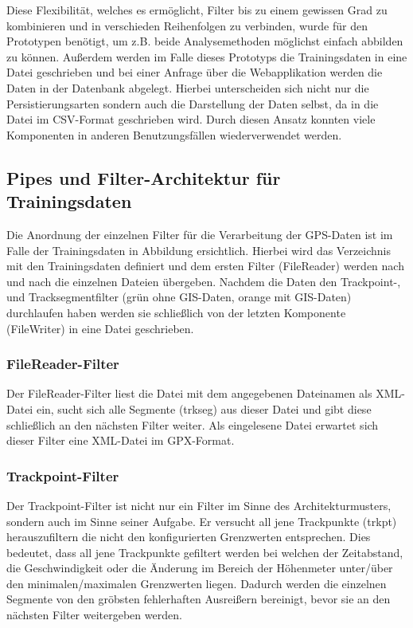 Diese Flexibilität, welches es ermöglicht, Filter bis zu einem gewissen Grad zu kombinieren und in verschieden Reihenfolgen zu verbinden, wurde für den Prototypen benötigt, um z.B. beide Analysemethoden möglichst einfach abbilden zu können. Außerdem werden im Falle dieses Prototyps die Trainingsdaten in eine Datei geschrieben und bei einer Anfrage über die Webapplikation werden die Daten in der Datenbank abgelegt. Hierbei unterscheiden sich nicht nur die Persistierungsarten sondern auch die Darstellung der Daten selbst, da in die Datei im CSV-Format geschrieben wird. Durch diesen Ansatz konnten viele Komponenten in anderen Benutzungsfällen wiederverwendet werden.

\subsection{Pipes und Filter-Architektur für Trainingsdaten}
Die Anordnung der einzelnen Filter für die Verarbeitung der GPS-Daten ist im Falle der Trainingsdaten in Abbildung  ersichtlich. Hierbei wird das Verzeichnis mit den Trainingsdaten definiert und dem ersten Filter (FileReader) werden nach und nach die einzelnen Dateien übergeben. Nachdem die Daten den Trackpoint-, und Tracksegmentfilter (grün ohne GIS-Daten, orange mit GIS-Daten) durchlaufen haben werden sie schließlich von der letzten Komponente (FileWriter) in eine Datei geschrieben.


\subsubsection{FileReader-Filter}
Der FileReader-Filter liest die Datei mit dem angegebenen Dateinamen als XML-Datei ein, sucht sich alle Segmente (trkseg) aus dieser Datei und gibt diese schließlich an den nächsten Filter weiter. Als eingelesene Datei erwartet sich dieser Filter eine XML-Datei im GPX-Format.

\subsubsection{Trackpoint-Filter}
Der Trackpoint-Filter ist nicht nur ein Filter im Sinne des Architekturmusters, sondern auch im Sinne seiner Aufgabe. Er versucht all jene Trackpunkte (trkpt) herauszufiltern die nicht den konfigurierten Grenzwerten entsprechen. Dies bedeutet, dass all jene Trackpunkte gefiltert werden bei welchen der Zeitabstand, die Geschwindigkeit oder die Änderung im Bereich der Höhenmeter unter/über den minimalen/maximalen Grenzwerten liegen. Dadurch werden die einzelnen Segmente von den gröbsten fehlerhaften Ausreißern bereinigt, bevor sie an den nächsten Filter weitergeben werden.

